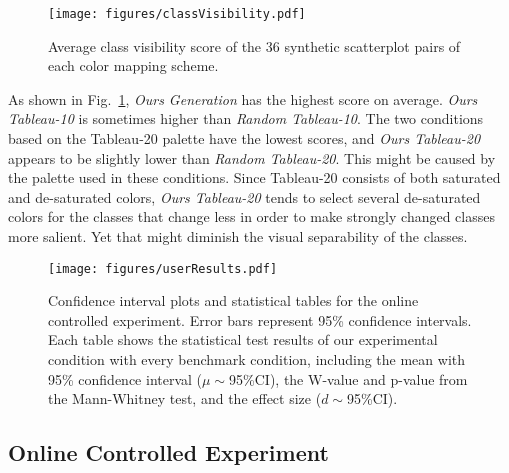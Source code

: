 
\begin{figure}[h]
\centering
\texttt{[image: figures/classVisibility.pdf]}
\caption{Average class visibility score of the 36 synthetic scatterplot pairs of each color mapping scheme.}
\vspace*{-3mm}
\label{fig:classVisibility}
\end{figure}

As shown in Fig.~\ref{fig:classVisibility}, \emph{Ours Generation} has the highest score on average. \emph{Ours Tableau-10} is sometimes higher than \emph{Random Tableau-10}. The two conditions based on the Tableau-20 palette have the lowest scores, and \emph{Ours Tableau-20} appears to be slightly lower than \emph{Random Tableau-20}. This might be caused by the palette used in these conditions. Since Tableau-20 consists of both saturated and de-saturated colors, \emph{Ours Tableau-20} tends to select several de-saturated colors for the classes that change less in order to make strongly changed classes more salient. Yet that might diminish the visual separability of the classes.

\begin{figure*}[t]
\centering
\texttt{[image: figures/userResults.pdf]}
\caption{Confidence interval plots and statistical tables for the online controlled experiment. Error bars represent 95\% confidence intervals. Each table shows the statistical test results of our experimental condition with every benchmark condition, including the mean with 95\% confidence interval ($\mu\sim$95\%CI), the W-value and p-value from the Mann-Whitney test, and the effect size ($d\sim$95\%CI).
}
\vspace*{-3mm}
\label{fig:userResults}
\end{figure*}

\subsection{Online Controlled Experiment}
\label{subsec:onlinestudy}


